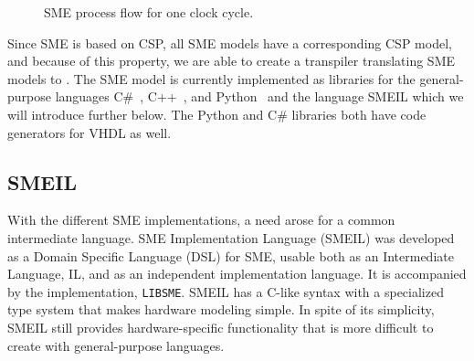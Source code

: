 


\begin{figure}[!ht]
  \centering
  \caption{SME process flow for one clock cycle.}
  \label{fig:sme_process_flow}
\end{figure}
Since SME is based on CSP, all SME models have a
corresponding CSP model, and because of this property, we are able to create a transpiler translating SME models to \cspm{}.
The SME model is currently implemented as libraries for the general-purpose languages C\#~\cite{Skovhede}, C++~\cite{asheim2015}, and Python~\cite{asheim2016vhdl} and the language SMEIL which we will introduce further below. The Python and C\# libraries both have code generators for VHDL as well.
\subsection{SMEIL}
\label{SMEIL-section}
With the different SME implementations, a need arose for a common intermediate language. SME Implementation Language (SMEIL) was developed as a Domain Specific Language (DSL) for SME, usable both as an Intermediate Language, IL, and as an independent implementation language. It is accompanied by the implementation, \texttt{LIBSME}. %
SMEIL has a C-like syntax with a specialized type system that makes hardware modeling simple. In spite of its simplicity, SMEIL still provides hardware-specific functionality that is more difficult to create with general-purpose languages.

